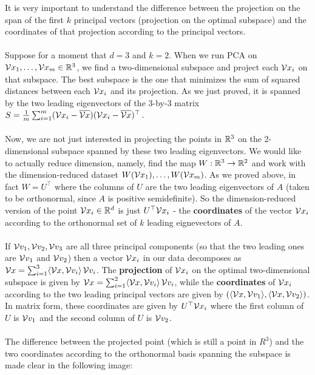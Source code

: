 It is very important to understand the difference between 
the projection on the span of the first $k$ principal vectors (projection on the
optimal subspace) and the coordinates of that projection according to the
principal vectors.
\\~\\
Suppose for a moment that $d=3$ and $k=2$. When we run PCA on
$\mathcal{V}{x}_1,\ldots,\mathcal{V}{x}_m\in\mathbb{R}^3$, we find a two-dimensional subspace and project
each $\mathcal{V}{x}_i$ on that subspace. The best subspace is the one that minimizes the
sum of squared distances between each $\mathcal{V}{x}_i$ and its projection. As we just
proved, it is spanned by the two leading eigenvectors of the $3$-by-$3$ matrix
$
           S = \frac{1}{m}\sum_{i=1}^m (\mathcal{V}{x}_i-\overline{\mathcal{V}{x}}) 
           (\mathcal{V}{x}_i -\overline{\mathcal{V}{x}})^{\top}\,.
         $
\\~\\
Now, we are not just interested in projecting the points in $\mathbb{R}^3$ 
on the 2-dimensional subspace  spanned by these two leading eigenvectors.
We would like to actually reduce dimension, namely, find the map 
$W:\mathbb{R}^3\to \mathbb{R}^2$ and work with the dimension-reduced dataset  
$W(\mathcal{V}{x}_1),\ldots,W(\mathcal{V}{x}_m)$. As we proved above, 
in fact $W=U^\top$ where the columns of
$U$ are the two leading eigenvectors of $A$ (taken to be orthonormal, since $A$
is positive semidefinite). So the dimension-reduced version of the point
$\mathcal{V}{x}_i\in\mathbb{R}^d$ is just
$U^\top \mathcal{V}{x}_i$ - the {\bf coordinates} of the vector $\mathcal{V}{x}_i$ according to the
orthonormal set of $k$ leading eignevectors of $A$. 
\\~\\
If $\mathcal{V}{v}_1,\mathcal{V}{v}_2,\mathcal{V}{v}_3$  are all three principal components (so that the
two leading ones are $\mathcal{V}{v}_1$ and $\mathcal{V}{v}_2$) then 
a vector $\mathcal{V}{x}_i$ in our data decomposes as
$\mathcal{V}{x}=\sum_{i=1}^3 \langle \mathcal{V}{x},\mathcal{V}{v}_i \rangle\, \mathcal{V}{v}_i$. 
The {\bf projection}
of $\mathcal{V}{x}_i$ on the optimal two-dimensional subspace 
is given by 
$\mathcal{V}{x}=\sum_{i=1}^2 \langle \mathcal{V}{x},\mathcal{V}{v}_i \rangle\, \mathcal{V}{v}_i$, while the 
{\bf coordinates}
of $\mathcal{V}{x}_i$ according to the two leading principal vectors are
given by $(\langle \mathcal{V}{x},\mathcal{V}{v}_1 \rangle,\langle \mathcal{V}{x},\mathcal{V}{v}_2 \rangle)$. In matrix form, these
coordinates are given by $U^\top \mathcal{V}{x}_i$ where the first column of $U$ is
$\mathcal{V}{v}_1$ and the second column of $U$ is $\mathcal{V}{v}_2$.
\\~\\
The difference between the projected point (which is still a point in $R^3$) and
the two coordinates according to the orthonormal basis spanning the subspace is
made clear in the following image:
